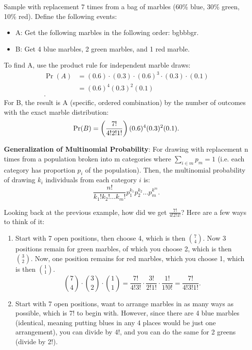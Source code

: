 \begin{example}{Sample with replacement 7 times from a bag of marbles (60\% blue, 30\% green, 10\% red). Define the following events:
\begin{itemize}
\item A: Get the following marbles in the following order: bgbbbgr.
\item B: Get 4 blue marbles, 2 green marbles, and 1 red marble.
\end{itemize}
\tcbline 
To find A, use the product rule for independent marble draws:
\begin{align*}
    \Pr(A) &= (0.6) \cdot (0.3) \cdot (0.6)^3 \cdot (0.3) \cdot (0.1) \\
    &= (0.6)^4 (0.3)^2 (0.1) \\
.\end{align*}
For B, the result is A (specific, ordered combination) by the number of outcomes with the exact marble distribution:
\[
\Pr(B) = \left( \frac{7!}{4!2!1!} \right) (0.6)^4 (0.3)^2 (0.1) \\
.\]
}
\end{example}
\textbf{Generalization of Multinomial Probability}: For drawing with replacement n times from a population broken into m categories where $\sum_{i \in m} p_m = 1$ (i.e. each category has proportion $p_i$ of the population). Then, the multinomial probability of drawing $k_i$ individuals from each category $i$ is:
\[
    \frac{n!}{k_1!k_2!\ldots k_m!} p_1^{k_1} p_2^{k_2} \ldots p_m^{k^m}
.\]
\begin{notebox}
Looking back at the previous example, how did we get $\frac{7!}{4!2!1!}$? Here are a few ways to think of it:
\begin{enumerate}
    \item Start with 7 open positions, then choose 4, which is then $\binom{7}{4}$. Now 3 positions remain for green marbles, of which you choose 2, which is then $\binom{3}{2}$. Now, one position remains for red marbles, which you choose 1, which is then $\binom{1}{1}$.
\[
\binom{7}{4} \cdot \binom{3}{2} \cdot \binom{1}{1} = \frac{7!}{4!3!} \cdot \frac{3!}{2!1!} \cdot \frac{1!}{1!0!} = \frac{7!}{4!3!1!}
.\]
\item Start with 7 open positions, want to arrange marbles in as many ways as possible, which is 7! to begin with. However, since there are 4 blue marbles (identical, meaning putting blues in any 4 places would be just one arrangement), you can divide by 4!, and you can do the same for 2 greens (divide by 2!).
\end{enumerate}
\end{notebox}
